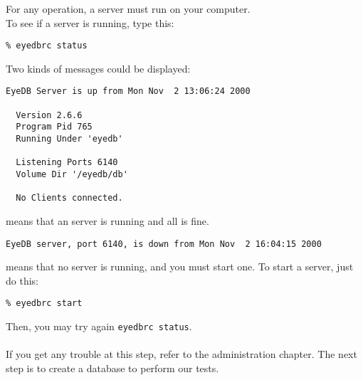 \begin{tabbing}
\end{tabbing}
For any \eyedb operation, a server must run on your computer.
\\
To see if a server is running, type this:
\verbsize \begin{verbatim}
% eyedbrc status
\end{verbatim}
\normalsize
Two kinds of messages could be displayed:
\be
\item 
\verbsize \begin{verbatim}
EyeDB Server is up from Mon Nov  2 13:06:24 2000
 
  Version 2.6.6
  Program Pid 765
  Running Under 'eyedb'
 
  Listening Ports 6140
  Volume Dir '/eyedb/db'
 
  No Clients connected.
\end{verbatim}
\normalsize
means that an \eyedb server is running and all is fine.
\item \verbsize \begin{verbatim}
EyeDB server, port 6140, is down from Mon Nov  2 16:04:15 2000
\end{verbatim}
\normalsize
means that no \eyedb server is running, and you must start one.
\ee
To start a server, just do this:
\verbsize \begin{verbatim}
% eyedbrc start
\end{verbatim}
\normalsize
Then, you may try again \texttt{eyedbrc status}.\\
\\
If you get any trouble at this step, refer to the administration chapter.
The next step is to create a database to perform our tests.
\\

